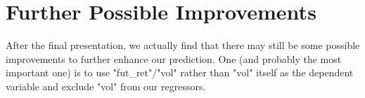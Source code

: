 \documentclass[onecolumn]{article}
\begin{document}
\section{Further Possible Improvements}
After the final presentation, we actually find that there may still be some possible improvements to further enhance our prediction. One (and probably the most important one) is to use "fut\_ret"/"vol" rather than "vol" itself as the dependent variable and exclude "vol" from our regressors.
\end{document}
